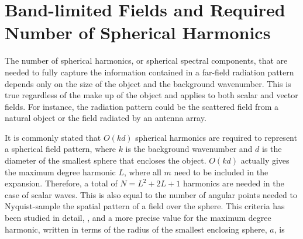 {\footnotesize
{}
}


%
%
%



\section{Band-limited Fields and Required Number of Spherical Harmonics}

The number of spherical harmonics, or spherical spectral components, that are needed to fully capture the information contained in a far-field radiation pattern depends only on the size of the object and the background wavenumber. This is true regardless of the make up of the object and applies to both scalar and vector fields. For instance, the radiation pattern could be the scattered field from a natural object or the field radiated by an antenna array. 

It is commonly stated that $O(kd)$ spherical harmonics are required to represent a spherical field pattern, where $k$ is the background wavenumber and $d$ is the diameter of the smallest sphere that encloses the object. $O(kd)$ actually gives the maximum degree harmonic $L$, where all $m$ need to be included in the expansion. Therefore, a total of $N = L^2 + 2L + 1$ harmonics are needed in the case of scalar waves. This is also equal to the number of angular points needed to Nyquist-sample the spatial pattern of a field over the sphere. This criteria has been studied in detail, \cite{yaghjian1996sampling}, and a more precise value for the maximum degree harmonic, written in terms of the radius of the smallest enclosing sphere, $a$, is 

